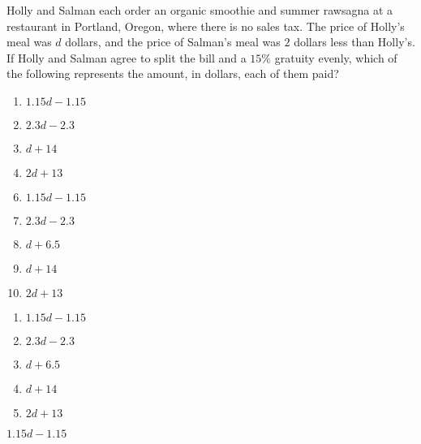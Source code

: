  
Holly and Salman each order an organic smoothie and summer rawsagna at a restaurant in Portland, Oregon, where there is no sales tax.  The price of Holly's meal was $d$ dollars, and the price of Salman's meal was $2$ dollars less than Holly's.  If Holly and Salman agree to split the bill and a $15\%$ gratuity evenly, which of the following represents the amount, in dollars, each of them paid? 


\ifsat
	\begin{enumerate}[label=\Alph*)]
		\item $1.15d-1.15 $ %
		\item $2.3d-2.3 $ 
		\item $d+14 $ 
		\item $2d+13 $
 
	\end{enumerate}
\else
\fi

\ifacteven
	\begin{enumerate}[label=\textbf{\Alph*.},itemsep=\fill,align=left]
		\setcounter{enumii}{5}
		\item $1.15d-1.15 $ %
		\item $2.3d-2.3 $ 
		\item $d+6.5$
		\addtocounter{enumii}{1}
		\item $d+14 $ 
		\item $2d+13 $
 
	\end{enumerate}
\else
\fi

\ifactodd
	\begin{enumerate}[label=\textbf{\Alph*.},itemsep=\fill,align=left]
		\item $1.15d-1.15 $ %
		\item $2.3d-2.3 $ 
		\item $d+6.5$
		\item $d+14 $ 
		\item $2d+13 $
 
	\end{enumerate}
\else
\fi

\ifgridin
 $1.15d-1.15 $ %
		
\else
\fi

